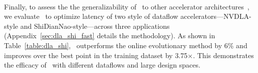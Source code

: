 ~

%
Finally, to assess the the generalizability of \primemethodname\ to other accelerator architectures~\citep{kao2020confuciux}, we evaluate \primemethodname\ to optimize latency of two style of dataflow accelerators---NVDLA-style and ShiDianNao-style---across three applications (Appendix~\ref{sec:dla_shi_fast} details the methodology).
%
As shown in Table~\ref{table:dla_shi}, \primemethodname\ outperforms the online evolutionary method by 6\% and improves over the best point in the training dataset by 3.75$\times$.
%
This demonstrates the efficacy of \primemethodname\ with different dataflows and large design spaces.
%

